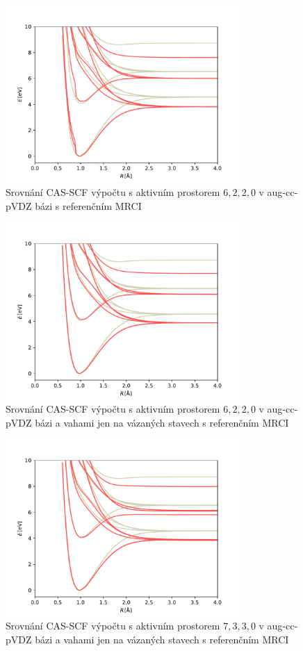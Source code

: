 \begin{figure}
\centering
\includegraphics[width=0.8\textwidth]{../img/OH-MULTI-DZ-6220.pdf}
\caption{Srovnání CAS-SCF výpočtu s aktivním prostorem $6,2,2,0$ v aug-cc-pVDZ bázi 
s referenčním MRCI}
\label{gr_OH_6220}
\end{figure}

\begin{figure}
\centering
\includegraphics[width=0.8\textwidth]{../img/OH-MULTI-DZ-6220-w8.pdf}
\caption{Srovnání CAS-SCF výpočtu s aktivním prostorem $6,2,2,0$ v aug-cc-pVDZ bázi  a vahami jen na vázaných stavech s referenčním MRCI}
\label{gr_OH_6220_w}
\end{figure}

\begin{figure}
\centering
\includegraphics[width=0.8\textwidth]{../img/OH-MULTI-DZ-7330-w1.pdf}
\caption{Srovnání CAS-SCF výpočtu s aktivním prostorem $7,3,3,0$ v aug-cc-pVDZ bázi  a vahami jen na vázaných stavech s referenčním MRCI}
\label{gr_OH_7330_w}
\end{figure}